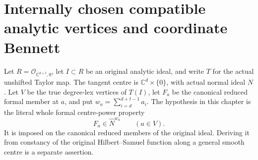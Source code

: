 \section{Internally chosen compatible analytic vertices and coordinate Bennett}

Let $R=\mathcal O_{\mathbb C^{d+t},0}$, let $I\subset R$ be an
original analytic ideal, and write $T$ for the actual unshifted Taylor
map. The tangent centre is $\mathbb C^d\times\{0\}$, with actual
normal ideal $N$. Let $V$ be the true degree-lex vertices of $T(I)$,
let $F_a$ be the canonical reduced formal member at $a$, and put
$w_a=\sum_{i=d}^{d+t-1}a_i$. The hypothesis in this chapter is the
literal whole formal centre-power property
\[
 F_a\in\widehat N^{w_a}\qquad(a\in V).
\]
It is imposed on the canonical reduced members of the original ideal.
Deriving it from constancy of the original Hilbert--Samuel function
along a general smooth centre is a separate assertion.

